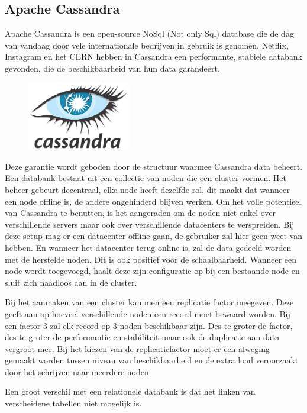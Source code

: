 \documentclass{article}
\begin{document}
	\subsection{Apache Cassandra}
	Apache Cassandra is een open-source NoSql (Not only Sql) database die de dag van vandaag door vele internationale bedrijven 
	in gebruik is genomen. 
	Netflix, Instagram en het CERN hebben in Cassandra een performante, stabiele databank gevonden, 
	die de beschikbaarheid van hun data garandeert.
	\par
	\begin{figure}
  		\includegraphics[width=0.4\textwidth]{images/cassandra.png}
	\end{figure}
	Deze garantie wordt geboden door de structuur waarmee Cassandra data beheert. 
	Een databank bestaat uit een collectie van noden die een cluster vormen. 
	Het beheer gebeurt decentraal, elke node heeft dezelfde rol, 
	dit maakt dat wanneer een node offline is, de andere ongehinderd blijven werken. 
	Om het volle potentieel van Cassandra te benutten, is het aangeraden om de noden niet enkel over verschillende servers 
	maar ook over verschillende datacenters te verspreiden. 
	Bij deze setup mag er een datacenter offline gaan, de gebruiker zal hier geen weet van hebben.  
	En wanneer het datacenter terug online is, zal de data gedeeld worden met de herstelde noden.
	Dit is ook positief voor de schaalbaarheid. 
	Wanneer een node wordt toegevoegd, haalt deze zijn configuratie op bij een bestaande node en sluit zich naadloos aan in de cluster.
	\par
	Bij het aanmaken van een cluster kan men een replicatie factor meegeven. 
	Deze geeft aan op hoeveel verschillende noden een record moet bewaard worden. 
	Bij een factor 3 zal elk record op 3 noden beschikbaar zijn. 
	Des te groter de factor, des te groter de performantie en stabiliteit maar ook de duplicatie aan data vergroot mee.
	Bij het kiezen van de replicatiefactor moet er een afweging gemaakt worden tussen niveau van beschikbaarheid en
	de extra load veroorzaakt door het schrijven naar meerdere noden.
	\par
	Een groot verschil met een relationele databank is dat het linken van verscheidene tabellen niet mogelijk is.
\end{document}
